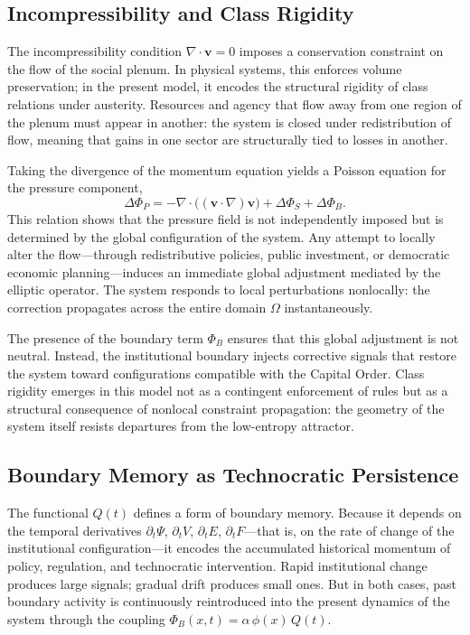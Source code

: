\documentclass[12pt,a4paper]{article}
\begin{document}
\subsection{Incompressibility and Class Rigidity}

The incompressibility condition $\nabla\cdot\mathbf{v}=0$ imposes a conservation constraint on the flow of the social plenum. In physical systems, this enforces volume preservation; in the present model, it encodes the structural rigidity of class relations under austerity. Resources and agency that flow away from one region of the plenum must appear in another: the system is closed under redistribution of flow, meaning that gains in one sector are structurally tied to losses in another.

Taking the divergence of the momentum equation yields a Poisson equation for the pressure component,
\[
\Delta\Phi_P
=
-\nabla\cdot\bigl((\mathbf{v}\cdot\nabla)\mathbf{v}\bigr)
+\Delta\Phi_S
+\Delta\Phi_B.
\]
This relation shows that the pressure field is not independently imposed but is determined by the global configuration of the system. Any attempt to locally alter the flow---through redistributive policies, public investment, or democratic economic planning---induces an immediate global adjustment mediated by the elliptic operator. The system responds to local perturbations nonlocally: the correction propagates across the entire domain $\Omega$ instantaneously.

The presence of the boundary term $\Phi_B$ ensures that this global adjustment is not neutral. Instead, the institutional boundary injects corrective signals that restore the system toward configurations compatible with the Capital Order. Class rigidity emerges in this model not as a contingent enforcement of rules but as a structural consequence of nonlocal constraint propagation: the geometry of the system itself resists departures from the low-entropy attractor.

\subsection{Boundary Memory as Technocratic Persistence}

The functional $Q(t)$ defines a form of boundary memory. Because it depends on the temporal derivatives $\partial_t\Psi$, $\partial_t V$, $\partial_t E$, $\partial_t F$---that is, on the rate of change of the institutional configuration---it encodes the accumulated historical momentum of policy, regulation, and technocratic intervention. Rapid institutional change produces large signals; gradual drift produces small ones. But in both cases, past boundary activity is continuously reintroduced into the present dynamics of the system through the coupling $\Phi_B(x,t) = \alpha\,\phi(x)\,Q(t)$.
\end{document}
